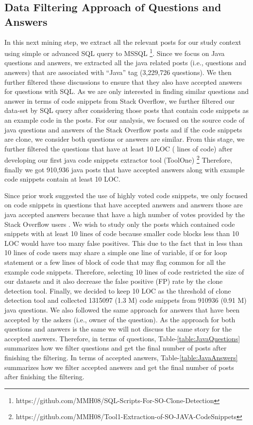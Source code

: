 \documentclass[conference]{IEEEtran}
\begin{document}
	
	\subsection{Data Filtering Approach of Questions and Answers}
	In this next mining step, we extract all the relevant posts for our study context using simple or advanced SQL query to MSSQL \footnote{https://github.com/MMH08/SQL-Scripts-For-SO-Clone-Detection}. Since we focus on Java questions and answers, we extracted all the java related posts (i.e., questions and answers) that are associated with “Java” tag (3,229,726 questions). We then further filtered these discussions to ensure that they also have accepted answers for questions with SQL. As we are only interested in finding similar questions and answer in terms of code snippets from Stack Overflow, we further filtered our data-set by SQL query after considering those posts that contain code snippets as  an example code in the posts. For our analysis, we focused on the source code of java questions and answers of the Stack Overflow posts and if the code snippets are clone, we consider both questions or answers are similar. From this stage, we further filtered the questions that have at least 10 LOC ( lines of code) after developing our first java code snippets extractor tool (ToolOne) \footnote{https://github.com/MMH08/Tool1-Extraction-of-SO-JAVA-CodeSnippets} Therefore,  finally we got 910,936 java posts that have accepted answers along with example code snippets contain at least 10 LOC. 
	
	Since prior work suggested the use of highly voted code snippets, we only focused on code snippets in questions that have accepted answers and answers those are java accepted answers because that have a high number of votes provided by the Stack Overflow users \cite{b8}. We wish to study only the posts which contained code snippets with at least 10 lines of code because smaller code blocks less than 10 LOC would have too many false positives. This due to the fact that in less than 10 lines of code users may share a simple one line of variable, if or for loop statement or a few lines of block of code that may flag common for all the example code snippets. Therefore, selecting 10 lines of code restricted the size of our datasets and it also decrease the false positive (FP) rate by the clone detection tool. Finally, we decided to keep 10 LOC as the threshold of clone detection tool and collected 1315097 (1.3 M) code snippets from 910936 (0.91 M) java questions. We also followed the same approach for answers that have been accepted by the askers (i.e., owner of the question). As the approach for both questions and answers is the same we will not discuss the same story for the accepted answers. Therefore, in terms of questions, Table-\ref{table:JavaQuestions} summarizes how we filter questions and get the final number of posts after finishing the filtering. In terms of accepted answers, Table-\ref{table:JavaAnswers} summarizes how we filter accepted answers and get the final number of posts after finishing the filtering.
	
\end{document}

